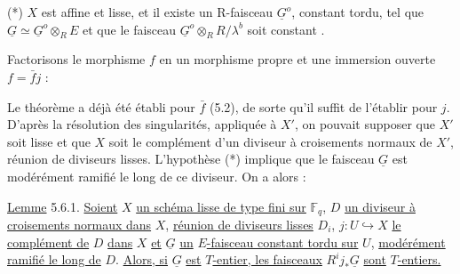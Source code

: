 (*)  $X$ est affine et lisse, et il existe un R-faisceau $\underline{G}^o$, constant tordu, tel que $\underline{G} \simeq \underline{G}^o \otimes_R E$ et que le faisceau $\underline{G}^o \otimes_R R/\lambda^b$ soit constant .

Factorisons le morphisme $f$ en un morphisme propre et une immersion ouverte $f = \bar{f} j$ :

\begin{center}
\end{center}
Le théorème a déjà été établi pour $\bar{f}$ (5.2), de sorte qu'il suffit de l'établir pour $j$. D'après la résolution des singularités, appliquée à $X'$, on pouvait supposer que $X'$ soit lisse et que $X$ soit le complément d'un diviseur à croisements normaux de $X'$, réunion de diviseurs lisses. L'hypothèse (*) implique que le faisceau $\underline{G}$ est modérément ramifié le long de ce diviseur. On a alors :



\underline{Lemme} 5.6.1. \underline{Soient} $X$ \underline{un schéma lisse de type fini sur} $\mathbb{F}_q$, $D$ \underline{un diviseur à croisements normaux dans} $X$, \underline{réunion de diviseurs lisses} $D_i$, $j : U \hookrightarrow X$ \underline{le complément de} $D$ \underline{dans} $X$ \underline{et} $\underline{G}$ \underline{un} $E$\underline{-faisceau constant tordu sur} $U$, \underline{modérément ramifié le long de} $D$. \underline{Alors, si} $\underline{G}$ \underline{est} $T$\underline{-entier, les faisceaux} $R^i j_*\underline{G}$ \underline{sont} $T$\underline{-entiers.}

